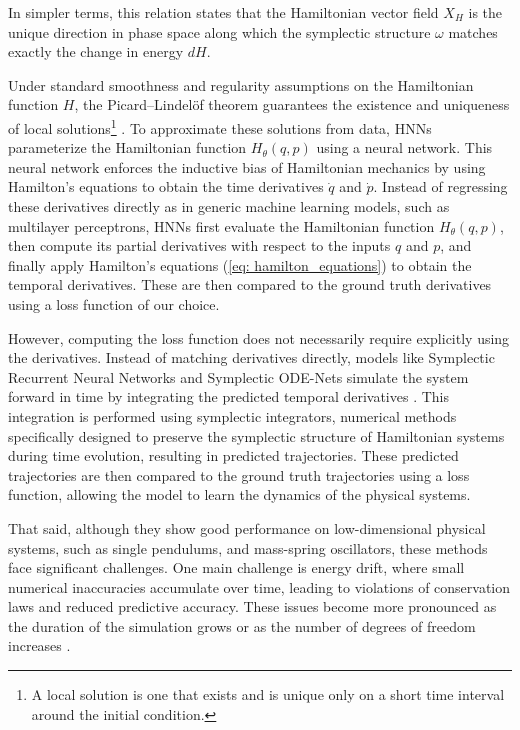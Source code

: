 \documentclass{article}
\theoremstyle{plain}
\theoremstyle{definition}
\theoremstyle{remark}
\begin{document}
In simpler terms, this relation states that the Hamiltonian vector field $X_H$ is the unique direction in phase space along which the symplectic structure $\omega$ matches exactly the change in energy $dH$.

\fi






Under standard smoothness and regularity assumptions on the Hamiltonian function $H$, the Picard–Lindelöf theorem guarantees the existence and uniqueness of local solutions\footnote{A local solution is one that exists and is unique only on a short time interval around the initial condition.} \cite{walter1998ordinary}. To approximate these solutions from data, HNNs parameterize the Hamiltonian function $H_\theta(q,p)$ using a neural network.  
This neural network enforces the inductive bias of Hamiltonian mechanics by using Hamilton’s equations to obtain the time derivatives $\dot{q}$ and $\dot{p}$. Instead of regressing these derivatives directly as in generic machine learning models, such as multilayer perceptrons, HNNs first evaluate the Hamiltonian function $H_\theta(q,p)$, then compute its partial derivatives with respect to the inputs $q$ and $p$, and finally apply Hamilton’s equations (\ref{eq: hamilton_equations}) to obtain the temporal derivatives. These are then compared to the ground truth derivatives using a loss function of our choice.

However, computing the loss function does not necessarily require explicitly using the derivatives. Instead of matching derivatives directly, models like Symplectic Recurrent Neural Networks and Symplectic ODE-Nets simulate the system forward in time by integrating the predicted temporal derivatives \cite{symplecticrecurrentneuralnetworks, zhong2024symplecticodenetlearninghamiltonian}. This integration is performed using symplectic integrators, numerical methods specifically designed to preserve the symplectic structure of Hamiltonian systems during time evolution, resulting in predicted trajectories. These predicted trajectories are then compared to the ground truth trajectories using a loss function, allowing the model to learn the dynamics of the physical systems.

That said, although they show good performance on low-dimensional physical systems, such as single pendulums, and mass-spring oscillators, these methods face significant challenges.  
One main challenge is energy drift, where small numerical inaccuracies accumulate over time, leading to violations of conservation laws and reduced predictive accuracy.  
These issues become more pronounced as the duration of the simulation grows or as the number of degrees of freedom increases \cite{hamiltonian_neural_networks}.
\end{document}
